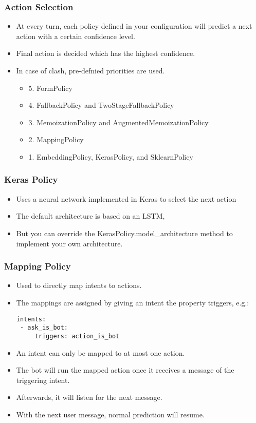  \begin{frame}[fragile]\frametitle{Action Selection}
\begin{itemize}
\item At every turn, each policy defined in your configuration will predict a next action with a certain confidence level.
\item Final action is decided which has the highest confidence.
\item In case of clash, pre-defnied priorities are used.
\begin{itemize}
\item 5. FormPolicy
\item 4. FallbackPolicy and TwoStageFallbackPolicy
\item 3. MemoizationPolicy and AugmentedMemoizationPolicy
\item 2. MappingPolicy
\item 1. EmbeddingPolicy, KerasPolicy, and SklearnPolicy
\end{itemize}
\end{itemize}


\end{frame}

 \begin{frame}[fragile]\frametitle{Keras Policy}
\begin{itemize}
\item Uses a neural network implemented in Keras to select the next action
\item The default architecture is based on an LSTM, 
\item But you can override the KerasPolicy.model\_architecture method to implement your own architecture.
\end{itemize}
\end{frame}

 \begin{frame}[fragile]\frametitle{Mapping Policy}
\begin{itemize}
\item Used to directly map intents to actions.
\item The mappings are assigned by giving an intent the property triggers, e.g.:
\begin{lstlisting}
intents:
 - ask_is_bot:
     triggers: action_is_bot
\end{lstlisting}
\item An intent can only be mapped to at most one action. 
\item The bot will run the mapped action once it receives a message of the triggering intent. 
\item Afterwards, it will listen for the next message. 
\item With the next user message, normal prediction will resume.
\end{itemize}
\end{frame}

